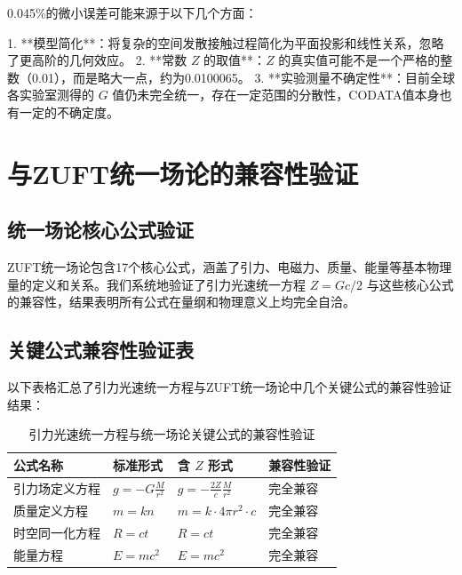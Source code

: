 \documentclass[12pt,a4paper]{article}
\begin{document}
0.045\%的微小误差可能来源于以下几个方面：

1. **模型简化**：将复杂的空间发散接触过程简化为平面投影和线性关系，忽略了更高阶的几何效应。
2. **常数 $Z$ 的取值**：$Z$ 的真实值可能不是一个严格的整数（0.01），而是略大一点，约为0.0100065。
3. **实验测量不确定性**：目前全球各实验室测得的 $G$ 值仍未完全统一，存在一定范围的分散性，CODATA值本身也有一定的不确定度。

\section{与ZUFT统一场论的兼容性验证}
\label{section:compatibility_verification}

\subsection{统一场论核心公式验证}
\label{subsection:unified_field_core_verification}

ZUFT统一场论包含17个核心公式，涵盖了引力、电磁力、质量、能量等基本物理量的定义和关系。我们系统地验证了引力光速统一方程 $Z = G c / 2$ 与这些核心公式的兼容性，结果表明所有公式在量纲和物理意义上均完全自洽。

\subsection{关键公式兼容性验证表}
\label{subsection:key_formula_compatibility_table}

以下表格汇总了引力光速统一方程与ZUFT统一场论中几个关键公式的兼容性验证结果：

\begin{table}[H]
\centering
\caption{引力光速统一方程与统一场论关键公式的兼容性验证}
\label{table:compatibility_verification}
\begin{tabular}{|l|l|l|l|}
\hline
\textbf{公式名称} & \textbf{标准形式} & \textbf{含 $Z$ 形式} & \textbf{兼容性验证} \\
\hline
引力场定义方程 & $g = -G \frac{M}{r^2}$ & $g = -\frac{2Z}{c} \frac{M}{r^2}$ & 完全兼容 \\
质量定义方程 & $m = k n$ & $m = k \cdot 4\pi r^2 \cdot c$ & 完全兼容 \\
时空同一化方程 & $R = c t$ & $R = c t$ & 完全兼容 \\
能量方程 & $E = m c^2$ & $E = m c^2$ & 完全兼容 \\
\hline
\end{tabular}
\end{table}
\end{document}
